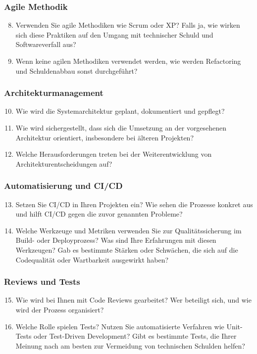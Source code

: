 \subsubsection*{Agile Methodik}
\begin{enumerate}
    \setcounter{enumi}{7}
    \item Verwenden Sie agile Methodiken wie Scrum oder XP? Falls ja, wie wirken sich diese Praktiken auf den Umgang mit technischer Schuld und Softwareverfall aus?
    \item Wenn keine agilen Methodiken verwendet werden, wie werden Refactoring und Schuldenabbau sonst durchgeführt?
\end{enumerate}

\subsubsection*{Architekturmanagement}
\begin{enumerate}
    \setcounter{enumi}{9}
    \item Wie wird die Systemarchitektur geplant, dokumentiert und gepflegt?
    \item Wie wird sichergestellt, dass sich die Umsetzung an der vorgesehenen Architektur orientiert, insbesondere bei älteren Projekten?
    \item Welche Herausforderungen treten bei der Weiterentwicklung von Architekturentscheidungen auf?
\end{enumerate}

\subsubsection*{Automatisierung und CI/CD}
\begin{enumerate}
    \setcounter{enumi}{12}
    \item Setzen Sie CI/CD in Ihren Projekten ein? Wie sehen die Prozesse konkret aus und hilft CI/CD gegen die zuvor genannten Probleme?
    \item Welche Werkzeuge und Metriken verwenden Sie zur Qualitätssicherung im Build- oder Deployprozess? Was sind Ihre Erfahrungen mit diesen Werkzeugen? Gab es bestimmte Stärken oder Schwächen, die sich auf die Codequalität oder Wartbarkeit ausgewirkt haben?
\end{enumerate}

\subsubsection*{Reviews und Tests}
\begin{enumerate}
    \setcounter{enumi}{14}
    \item Wie wird bei Ihnen mit Code Reviews gearbeitet? Wer beteiligt sich, und wie wird der Prozess organisiert?
    \item Welche Rolle spielen Tests? Nutzen Sie automatisierte Verfahren wie Unit-Tests oder Test-Driven Development? Gibt es bestimmte Tests, die Ihrer Meinung nach am besten zur Vermeidung von technischen Schulden helfen?
\end{enumerate}

